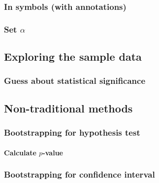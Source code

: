 \documentclass[12pt, krantz2,]{krantz}
\let\oldparagraph\paragraph
\renewcommand{\paragraph}[1]{\oldparagraph{#1}\mbox{}}
\begin{document}
\hypertarget{in-symbols-with-annotations}{%
\subsubsection*{In symbols (with annotations)}\label{in-symbols-with-annotations}}


\hypertarget{set-alpha}{%
\subsubsection*{\texorpdfstring{Set \(\alpha\)}{Set \textbackslash{}alpha}}\label{set-alpha}}


\hypertarget{exploring-the-sample-data}{%
\subsection{Exploring the sample data}\label{exploring-the-sample-data}}

\hypertarget{guess-about-statistical-significance}{%
\subsubsection*{Guess about statistical significance}\label{guess-about-statistical-significance}}


\hypertarget{non-traditional-methods}{%
\subsection{Non-traditional methods}\label{non-traditional-methods}}

\hypertarget{bootstrapping-for-hypothesis-test}{%
\subsubsection*{Bootstrapping for hypothesis test}\label{bootstrapping-for-hypothesis-test}}


\hypertarget{calculate-p-value}{%
\paragraph{\texorpdfstring{Calculate \(p\)-value}{Calculate p-value}}\label{calculate-p-value}}

\hypertarget{bootstrapping-for-confidence-interval}{%
\subsubsection*{Bootstrapping for confidence interval}\label{bootstrapping-for-confidence-interval}}
\end{document}
